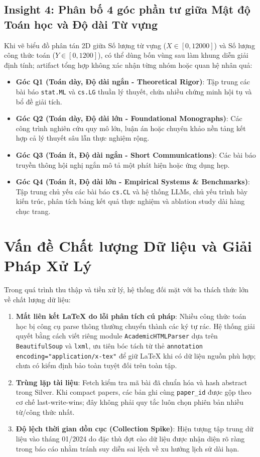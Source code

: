 \subsection{Insight 4: Phân bố 4 góc phần tư giữa Mật độ Toán học và Độ dài Từ vựng}
Khi vẽ biểu đồ phân tán 2D giữa Số lượng từ vựng ($X \in [0, 12000]$) và Số lượng công thức toán ($Y \in [0, 1200]$), có thể dùng bốn vùng sau làm khung diễn giải định tính; artifact tổng hợp không xác nhận từng nhóm hoặc quan hệ nhân quả:
\begin{itemize}
  \item \textbf{Góc Q1 (Toán dày, Độ dài ngắn - Theoretical Rigor)}: Tập trung các bài báo \texttt{stat.ML} và \texttt{cs.LG} thuần lý thuyết, chứa nhiều chứng minh hội tụ và bổ đề giải tích.
  \item \textbf{Góc Q2 (Toán dày, Độ dài lớn - Foundational Monographs)}: Các công trình nghiên cứu quy mô lớn, luận án hoặc chuyên khảo nền tảng kết hợp cả lý thuyết sâu lẫn thực nghiệm rộng.
  \item \textbf{Góc Q3 (Toán ít, Độ dài ngắn - Short Communications)}: Các bài báo truyền thông hội nghị ngắn mô tả một phát hiện hoặc ứng dụng hẹp.
  \item \textbf{Góc Q4 (Toán ít, Độ dài lớn - Empirical Systems \& Benchmarks)}: Tập trung chủ yếu các bài báo \texttt{cs.CL} và hệ thống LLMs, chủ yếu trình bày kiến trúc, phân tích bảng kết quả thực nghiệm và ablation study dài hàng chục trang.
\end{itemize}

\section{Vấn đề Chất lượng Dữ liệu và Giải Pháp Xử Lý}

Trong quá trình thu thập và tiền xử lý, hệ thống đối mặt với ba thách thức lớn về chất lượng dữ liệu:
\begin{enumerate}[label=\textbf{\arabic*.}]
  \item \textbf{Mất liên kết LaTeX do lỗi phân tích cú pháp}: Nhiều công thức toán học bị công cụ parse thông thường chuyển thành các ký tự rác. Hệ thống giải quyết bằng cách viết riêng module \texttt{AcademicHTMLParser} dựa trên \texttt{BeautifulSoup} và \texttt{lxml}, ưu tiên bóc tách từ thẻ \texttt{annotation encoding="application/x-tex"} để giữ LaTeX khi có dữ liệu nguồn phù hợp; chưa có kiểm định bảo toàn tuyệt đối trên toàn tập.
  \item \textbf{Trùng lặp tài liệu}: Fetch kiểm tra mã bài đã chuẩn hóa và hash abstract trong Silver. Khi compact papers, các bản ghi cùng \texttt{paper\_id} được gộp theo cơ chế last-write-wins; đây không phải quy tắc luôn chọn phiên bản nhiều từ/công thức nhất.
  \item \textbf{Độ lệch thời gian dồn cục (Collection Spike)}: Hiện tượng tập trung dữ liệu vào tháng 01/2024 do đặc thù đợt cào dữ liệu được nhận diện rõ ràng trong báo cáo nhằm tránh suy diễn sai lệch về xu hướng lịch sử dài hạn.
\end{enumerate}
